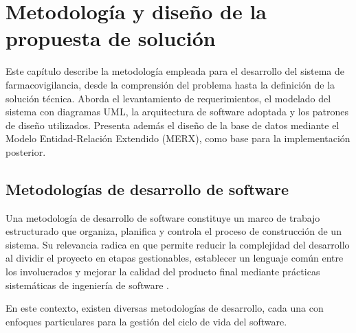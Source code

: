 \chapter{Metodología y diseño de la propuesta de solución}\label{chapter:proposal}


Este capítulo describe la metodología empleada para el desarrollo del sistema de farmacovigilancia, desde la comprensión del problema hasta la definición de la solución técnica. 
Aborda el levantamiento de requerimientos, el modelado del sistema con diagramas UML, la arquitectura de software adoptada y los patrones de diseño utilizados. 
Presenta además el diseño de la base de datos mediante el Modelo Entidad-Relación Extendido (MERX), como base para la implementación posterior.

\section{Metodologías de desarrollo de software}
\label{section:metodologias_desarrollo}

Una metodología de desarrollo de software constituye un marco de trabajo estructurado que organiza, planifica y controla el proceso de construcción de un sistema. 
Su relevancia radica en que permite reducir la complejidad del desarrollo al dividir el proyecto en etapas gestionables, establecer un lenguaje común entre los involucrados y mejorar la calidad del producto final mediante prácticas sistemáticas de ingeniería de software \cite{Pfleeger2015}.

En este contexto, existen diversas metodologías de desarrollo, cada una con enfoques particulares para la gestión del ciclo de vida del software.

